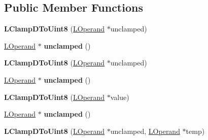 \subsection*{Public Member Functions}
\begin{DoxyCompactItemize}
\item 
{\bfseries L\+Clamp\+D\+To\+Uint8} (\hyperlink{classv8_1_1internal_1_1_l_operand}{L\+Operand} $\ast$unclamped)\hypertarget{classv8_1_1internal_1_1_l_clamp_d_to_uint8_ad9e1e3669905ca8387e7c292d3f2d9d5}{}\label{classv8_1_1internal_1_1_l_clamp_d_to_uint8_ad9e1e3669905ca8387e7c292d3f2d9d5}

\item 
\hyperlink{classv8_1_1internal_1_1_l_operand}{L\+Operand} $\ast$ {\bfseries unclamped} ()\hypertarget{classv8_1_1internal_1_1_l_clamp_d_to_uint8_ae1a158f439b6762d4b5d1555ad272ba5}{}\label{classv8_1_1internal_1_1_l_clamp_d_to_uint8_ae1a158f439b6762d4b5d1555ad272ba5}

\item 
{\bfseries L\+Clamp\+D\+To\+Uint8} (\hyperlink{classv8_1_1internal_1_1_l_operand}{L\+Operand} $\ast$unclamped)\hypertarget{classv8_1_1internal_1_1_l_clamp_d_to_uint8_ad9e1e3669905ca8387e7c292d3f2d9d5}{}\label{classv8_1_1internal_1_1_l_clamp_d_to_uint8_ad9e1e3669905ca8387e7c292d3f2d9d5}

\item 
\hyperlink{classv8_1_1internal_1_1_l_operand}{L\+Operand} $\ast$ {\bfseries unclamped} ()\hypertarget{classv8_1_1internal_1_1_l_clamp_d_to_uint8_ae1a158f439b6762d4b5d1555ad272ba5}{}\label{classv8_1_1internal_1_1_l_clamp_d_to_uint8_ae1a158f439b6762d4b5d1555ad272ba5}

\item 
{\bfseries L\+Clamp\+D\+To\+Uint8} (\hyperlink{classv8_1_1internal_1_1_l_operand}{L\+Operand} $\ast$value)\hypertarget{classv8_1_1internal_1_1_l_clamp_d_to_uint8_a0101517b76813a2b46b452bc23ced691}{}\label{classv8_1_1internal_1_1_l_clamp_d_to_uint8_a0101517b76813a2b46b452bc23ced691}

\item 
\hyperlink{classv8_1_1internal_1_1_l_operand}{L\+Operand} $\ast$ {\bfseries unclamped} ()\hypertarget{classv8_1_1internal_1_1_l_clamp_d_to_uint8_ae1a158f439b6762d4b5d1555ad272ba5}{}\label{classv8_1_1internal_1_1_l_clamp_d_to_uint8_ae1a158f439b6762d4b5d1555ad272ba5}

\item 
{\bfseries L\+Clamp\+D\+To\+Uint8} (\hyperlink{classv8_1_1internal_1_1_l_operand}{L\+Operand} $\ast$unclamped, \hyperlink{classv8_1_1internal_1_1_l_operand}{L\+Operand} $\ast$temp)\hypertarget{classv8_1_1internal_1_1_l_clamp_d_to_uint8_a368e67ef8b71239a870f2eabde7cfcf5}{}\label{classv8_1_1internal_1_1_l_clamp_d_to_uint8_a368e67ef8b71239a870f2eabde7cfcf5}


\end{DoxyCompactItemize}
